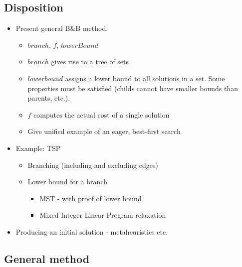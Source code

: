 \subsection{Disposition}
\begin{itemize}
\item Present general B\&B method.
  \begin{itemize}
  \item $branch$, $f$, $lowerBound$
  \item $branch$ gives rise to a tree of sets
  \item $lowerbound$ assigns a lower bound to all solutions in a
    set. Some properties must be satisfied (childs cannot have smaller
    bounds than parents, etc.).
  \item $f$ computes the actual cost of a single solution
  \item Give unified example of an eager, best-first search
  \end{itemize}
\item Example: TSP
  \begin{itemize}
  \item Branching (including and excluding edges)
  \item Lower bound for a branch
    \begin{itemize}
      \item MST - with proof of lower bound
      \item Mixed Integer Linear Program relaxation
    \end{itemize}
  \end{itemize}
 \item Producing an initial solution - metaheuristics etc.
\end{itemize}

\subsection{General method}

